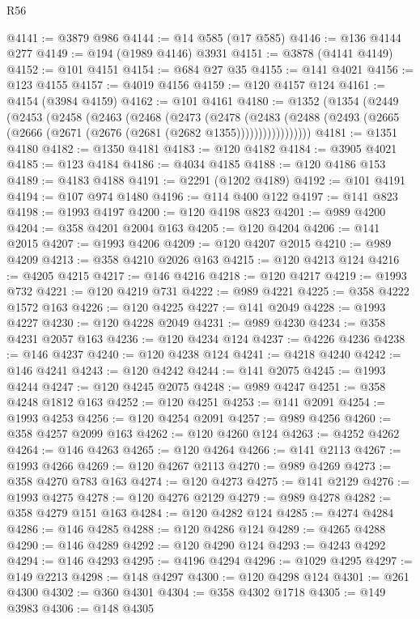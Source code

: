 \begin{lexlean}{R56}
\begin{coremodule}
@4141 := @3879 @986
@4144 := @14 @585 (@17 @585)
@4146 := @136 @4144 @277
@4149 := @194 (@1989 @4146) @3931
@4151 := @3878 (@4141 @4149)
@4152 := @101 @4151
@4154 := @684 @27 @35
@4155 := @141 @4021
@4156 := @123 @4155
@4157 := @4019 @4156
@4159 := @120 @4157 @124
@4161 := @4154 (@3984 @4159)
@4162 := @101 @4161
@4180 := @1352
    (@1354
      (@2449
        (@2453
          (@2458
            (@2463
              (@2468
                (@2473
                  (@2478
                    (@2483
                      (@2488 (@2493 (@2665 (@2666 (@2671 (@2676 (@2681 (@2682 @1355)))))))))))))))))
@4181 := @1351 @4180
@4182 := @1350 @4181
@4183 := @120 @4182
@4184 := @3905 @4021
@4185 := @123 @4184
@4186 := @4034 @4185
@4188 := @120 @4186 @153
@4189 := @4183 @4188
@4191 := @2291 (@1202 @4189)
@4192 := @101 @4191
@4194 := @107 @974 @1480
@4196 := @114 @400 @122
@4197 := @141 @823
@4198 := @1993 @4197
@4200 := @120 @4198 @823
@4201 := @989 @4200
@4204 := @358 @4201 @2004 @163
@4205 := @120 @4204
@4206 := @141 @2015
@4207 := @1993 @4206
@4209 := @120 @4207 @2015
@4210 := @989 @4209
@4213 := @358 @4210 @2026 @163
@4215 := @120 @4213 @124
@4216 := @4205 @4215
@4217 := @146 @4216
@4218 := @120 @4217
@4219 := @1993 @732
@4221 := @120 @4219 @731
@4222 := @989 @4221
@4225 := @358 @4222 @1572 @163
@4226 := @120 @4225
@4227 := @141 @2049
@4228 := @1993 @4227
@4230 := @120 @4228 @2049
@4231 := @989 @4230
@4234 := @358 @4231 @2057 @163
@4236 := @120 @4234 @124
@4237 := @4226 @4236
@4238 := @146 @4237
@4240 := @120 @4238 @124
@4241 := @4218 @4240
@4242 := @146 @4241
@4243 := @120 @4242
@4244 := @141 @2075
@4245 := @1993 @4244
@4247 := @120 @4245 @2075
@4248 := @989 @4247
@4251 := @358 @4248 @1812 @163
@4252 := @120 @4251
@4253 := @141 @2091
@4254 := @1993 @4253
@4256 := @120 @4254 @2091
@4257 := @989 @4256
@4260 := @358 @4257 @2099 @163
@4262 := @120 @4260 @124
@4263 := @4252 @4262
@4264 := @146 @4263
@4265 := @120 @4264
@4266 := @141 @2113
@4267 := @1993 @4266
@4269 := @120 @4267 @2113
@4270 := @989 @4269
@4273 := @358 @4270 @783 @163
@4274 := @120 @4273
@4275 := @141 @2129
@4276 := @1993 @4275
@4278 := @120 @4276 @2129
@4279 := @989 @4278
@4282 := @358 @4279 @151 @163
@4284 := @120 @4282 @124
@4285 := @4274 @4284
@4286 := @146 @4285
@4288 := @120 @4286 @124
@4289 := @4265 @4288
@4290 := @146 @4289
@4292 := @120 @4290 @124
@4293 := @4243 @4292
@4294 := @146 @4293
@4295 := @4196 @4294
@4296 := @1029 @4295
@4297 := @149 @2213
@4298 := @148 @4297
@4300 := @120 @4298 @124
@4301 := @261 @4300
@4302 := @360 @4301
@4304 := @358 @4302 @1718
@4305 := @149 @3983
@4306 := @148 @4305

\end{coremodule}
\end{lexlean}
